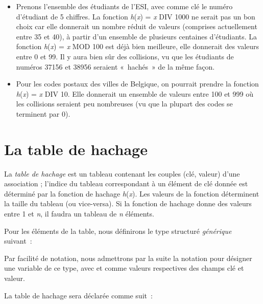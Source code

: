 	\begin{itemize}
		\item {
			Prenons l'ensemble des étudiants de l'ESI, avec comme 
			clé le numéro d'étudiant de 5 chiffres. La fonction
			\textit{h}(\textit{x}) = \textit{x} DIV 1000 ne serait 
			pas un bon choix car elle donnerait un nombre réduit de valeurs
			(comprises actuellement entre 35 et 40), à partir d'un 
			ensemble de plusieurs centaines d'étudiants. La fonction
			\textit{h}(\textit{x}) = \textit{x} MOD 100 
			est déjà bien meilleure, elle donnerait des valeurs entre 0 et 99.
			Il y aura bien sûr des collisions, vu que les étudiants de 
			numéros 37156 et 38956 seraient «~hachés~» de la même façon.}
		\item {
			Pour les codes postaux des villes de Belgique, on pourrait 
			prendre la fonction \textit{h}(\textit{x}) = \textit{x} DIV 10. 
			Elle donnerait un ensemble de valeurs entre 100 et 999 
			où les collisions seraient peu nombreuses (vu que la plupart
			des codes se terminent par 0).}
	\end{itemize}


\section{La table de hachage}

	La \textit{table de hachage} est un tableau contenant les couples 
	(clé, valeur) d'une association ; l'indice du tableau
	correspondant à un élément de clé donnée est déterminé par la 
	fonction de hachage \textit{h}(\textit{x}). Les valeurs
	de la fonction déterminent la taille du tableau (ou vice-versa). 
	Si la fonction de hachage donne des valeurs entre 1 et
	\textit{n}, il faudra un tableau de \textit{n} éléments.

	Pour les éléments de la table, nous définirons le type 
	structuré \textit{générique} suivant~:
	
	
	Par facilité de notation, nous admettrons par la suite la notation 
	 pour désigner une variable de ce type, 
	avec  et  comme valeurs 
	respectives des champs clé et valeur.

	La table de hachage sera déclarée comme suit~:

